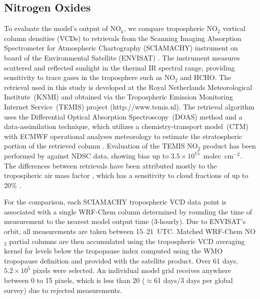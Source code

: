 \subsection{Nitrogen Oxides}\label{sect:val/nox}

To evaluate the model's output of NO$_{\mathrm{x}}$, we compare tropospheric NO$_2$
vertical column densities (VCDs) to retrievals from the Scanning Imaging Absorption
Spectrometer for Atmospheric Chartography (SCIAMACHY) instrument on board of the
Environmental Satellite (ENVISAT) \citep{Burrows:1995fk,Bovensmann:1999uq}. The
instrument measures scattered and reflected sunlight in the thermal IR spectral range,
providing sensitivity to trace gases in the troposphere such as NO$_2$ and HCHO. The
retrieval used in this study is developed at the Royal Netherlands Meteorological
Institute~(KNMI) and obtained via the Tropospheric Emission Monitoring Internet
Service~(TEMIS) project (http://www.temis.nl). The retrieval algorithm uses the Differential
Optical Absorption Spectroscopy~(DOAS) method and a data-assimilation technique,
which utilizes a chemistry-transport model~(CTM) with ECMWF operational analyses
meteorology to estimate the stratospheric portion of the retrieved column
\citep{Boersma:2004uq}. Evaluation of the TEMIS NO$_2$ product has been performed
by \citet{Lambert:2004aa} against NDSC data, showing bias up to
$3.5\times10^{15}$~molec~cm$^{-2}$. The differences between retrievals have been
attributed mostly to the tropospheric air mass factor \citep{vanderA:2010aa}, which has
a sensitivity to cloud fractions of up to 20\% \citep{Boersma:2004uq}.

For the comparison, each SCIAMACHY tropospheric VCD data point is associated with
a single WRF-Chem column determined by rounding the time of measurement to the
nearest model output time (3-hourly). Due to ENVISAT's orbit, all measurements are
taken between 15--21~UTC. Matched WRF-Chem NO$_2$ partial columns are then
accumulated using the tropospheric VCD averaging kernel for levels below the
tropopause index computed using the WMO tropopause definition and provided with the satellite product. Over 61 days,
$5.2\times10^5$ pixels were selected. An individual model grid receives anywhere between 0
to 15 pixels, which is less than 20 ($\approx$61 days/3 days per global survey) due
to rejected measurements.

